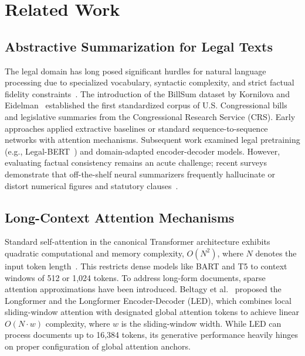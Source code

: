 \documentclass[conference]{IEEEtran}
\begin{document}
\section{Related Work}
\label{sec:related}

\subsection{Abstractive Summarization for Legal Texts}
The legal domain has long posed significant hurdles for natural language processing due to specialized vocabulary, syntactic complexity, and strict factual fidelity constraints~\cite{katz2012quantitative}. The introduction of the BillSum dataset by Kornilova and Eidelman~\cite{kornilova2019billsum} established the first standardized corpus of U.S. Congressional bills and legislative summaries from the Congressional Research Service (CRS). Early approaches applied extractive baselines or standard sequence-to-sequence networks with attention mechanisms. Subsequent work examined legal pretraining (e.g., Legal-BERT~\cite{chalkidis2020legalbert}) and domain-adapted encoder-decoder models. However, evaluating factual consistency remains an acute challenge; recent surveys demonstrate that off-the-shelf neural summarizers frequently hallucinate or distort numerical figures and statutory clauses~\cite{maynez2020faithfulness,kryscinski2020evaluating}.

\subsection{Long-Context Attention Mechanisms}
Standard self-attention in the canonical Transformer architecture exhibits quadratic computational and memory complexity, $O(N^2)$, where $N$ denotes the input token length~\cite{vaswani2017attention}. This restricts dense models like BART and T5 to context windows of 512 or 1,024 tokens. To address long-form documents, sparse attention approximations have been introduced. Beltagy et al.~\cite{beltagy2020longformer} proposed the Longformer and the Longformer Encoder-Decoder (LED), which combines local sliding-window attention with designated global attention tokens to achieve linear $O(N \cdot w)$ complexity, where $w$ is the sliding-window width. While LED can process documents up to 16,384 tokens, its generative performance heavily hinges on proper configuration of global attention anchors.
\end{document}
